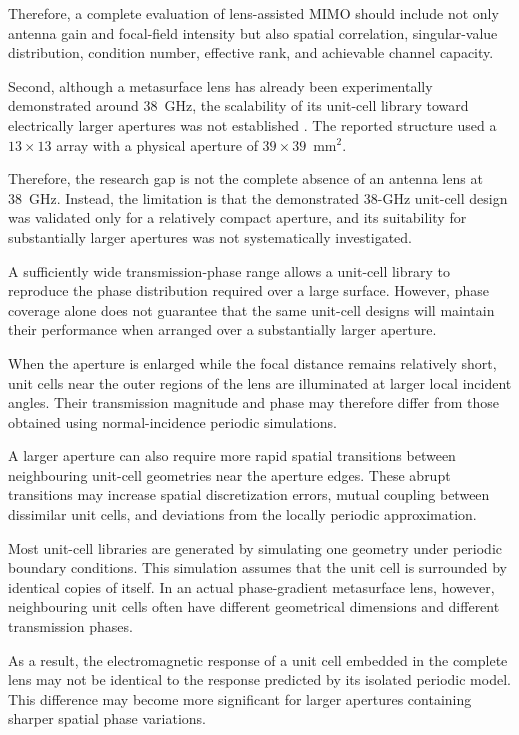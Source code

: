 Therefore, a complete evaluation of lens-assisted MIMO should include
not only antenna gain and focal-field intensity but also spatial
correlation, singular-value distribution, condition number, effective
rank, and achievable channel capacity.

Second, although a metasurface lens has already been experimentally
demonstrated around 38~GHz, the scalability of its unit-cell library
toward electrically larger apertures was not established
\cite{Lee2021}. The reported structure used a
$13\times13$ array with a physical aperture of
$39\times39$~mm$^2$.

Therefore, the research gap is not the complete absence of an antenna
lens at 38~GHz. Instead, the limitation is that the demonstrated
38-GHz unit-cell design was validated only for a relatively compact
aperture, and its suitability for substantially larger apertures was
not systematically investigated.

A sufficiently wide transmission-phase range allows a unit-cell
library to reproduce the phase distribution required over a large
surface. However, phase coverage alone does not guarantee that the
same unit-cell designs will maintain their performance when arranged
over a substantially larger aperture.

When the aperture is enlarged while the focal distance remains
relatively short, unit cells near the outer regions of the lens are
illuminated at larger local incident angles. Their transmission
magnitude and phase may therefore differ from those obtained using
normal-incidence periodic simulations.

A larger aperture can also require more rapid spatial transitions
between neighbouring unit-cell geometries near the aperture edges.
These abrupt transitions may increase spatial discretization errors,
mutual coupling between dissimilar unit cells, and deviations from the
locally periodic approximation.

Most unit-cell libraries are generated by simulating one geometry
under periodic boundary conditions. This simulation assumes that the
unit cell is surrounded by identical copies of itself. In an actual
phase-gradient metasurface lens, however, neighbouring unit cells
often have different geometrical dimensions and different
transmission phases.

As a result, the electromagnetic response of a unit cell embedded in
the complete lens may not be identical to the response predicted by
its isolated periodic model. This difference may become more
significant for larger apertures containing sharper spatial phase
variations.


